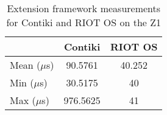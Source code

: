\begin{table}[!ht]
  \centering
  \begin{tabular}{l|c|c}
                & Contiki  & RIOT OS \\ \hline
  Mean ($\mu$s) & 90.5761  & 40.252      \\
  Min  ($\mu$s) & 30.5175  & 40      \\
  Max  ($\mu$s) & 976.5625 & 41     
  \end{tabular}
  \caption{Extension framework measurements for Contiki and RIOT OS on the Z1}
  \label{tab:extension-framework-z1}
  \end{table}